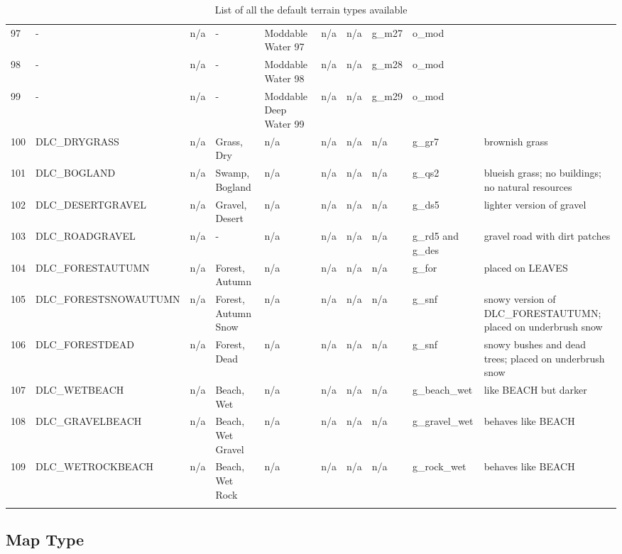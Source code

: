 \begin{appendices}
\begin{landscape}
\begin{longtable}{@{}p{5mm}|p{25mm}p{23mm}|p{14mm}p{14mm}p{14mm}p{14mm}|p{10mm}p{15mm}|p{45mm}@{}}
            97	& -	& n/a	& -	& Moddable Water 97	& n/a	& n/a	& g\_m27	& o\_mod		&  \\
            98	& -	& n/a	& -	& Moddable Water 98	& n/a	& n/a	& g\_m28	& o\_mod		&  \\
            99	& -	& n/a	& -	& Moddable Deep Water 99	& n/a	& n/a	& g\_m29	& o\_mod		&  \\
            100	& DLC\_DRYGRASS	& n/a	& Grass, Dry	& n/a	& n/a	& n/a	& n/a	& g\_gr7		& brownish grass \\
            101	& DLC\_BOGLAND	& n/a	& Swamp, Bogland	& n/a	& n/a	& n/a	& n/a	& g\_qs2		& blueish grass; no buildings; no natural resources \\
            102	& DLC\_DESERTGRAVEL	& n/a	& Gravel, Desert	& n/a	& n/a	& n/a	& n/a	& g\_ds5		& lighter version of gravel \\
            103	& DLC\_ROADGRAVEL	& n/a	& -	& n/a	& n/a	& n/a	& n/a	& g\_rd5 and g\_des		& gravel road with dirt patches \\
            104	& DLC\_FORESTAUTUMN	& n/a	& Forest, Autumn	& n/a	& n/a	& n/a	& n/a	& g\_for		& placed on LEAVES \\
            105	& DLC\_FORESTSNOWAUTUMN	& n/a	& Forest, Autumn Snow	& n/a	& n/a	& n/a	& n/a	& g\_snf		& snowy version of DLC\_FORESTAUTUMN; placed on underbrush snow \\
            106	& DLC\_FORESTDEAD	& n/a	& Forest, Dead	& n/a	& n/a	& n/a	& n/a	& g\_snf		& snowy bushes and dead trees; placed on underbrush snow \\
            107	& DLC\_WETBEACH	& n/a	& Beach, Wet	& n/a	& n/a	& n/a	& n/a	& g\_beach\_wet		& like BEACH but darker \\
            108	& DLC\_GRAVELBEACH	& n/a	& Beach, Wet Gravel	& n/a	& n/a	& n/a	& n/a	& g\_gravel\_wet		& behaves like BEACH \\
            109	& DLC\_WETROCKBEACH	& n/a	& Beach, Wet Rock	& n/a	& n/a	& n/a	& n/a	& g\_rock\_wet		& behaves like BEACH \\
            \bottomrule
            \caption{List of all the default terrain types available}
            \label{tbl:terrain}
        \end{longtable}
        
    \end{landscape}

    \subsection{Map Type}
    \label{subsection:maptype}


\end{appendices}
